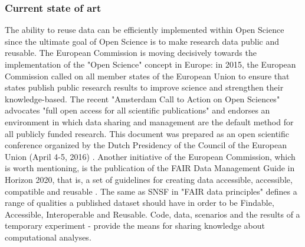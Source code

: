 \documentclass{vldb}
\begin{document}
\subsubsection{Current state of art}
The ability to reuse data can be efficiently implemented within Open Science since the ultimate goal of Open Science is to make research data public and reusable. The European Commission is moving decisively towards the implementation of the "Open Science" concept in Europe: in 2015, the European Commission called on all member states of the European Union to ensure that states publish public research results to improve science and strengthen their knowledge-based\cite{reus1}. The recent "Amsterdam Call to Action on Open Sciences" advocates "full open access for all scientific publications" and endorses an environment in which data sharing and management are the default method for all publicly funded research. This document was prepared as an open scientific conference organized by the Dutch Presidency of the Council of the European Union (April 4-5, 2016) \cite{reus2}. Another initiative of the European Commission, which is worth mentioning, is the publication of the FAIR Data Management Guide in Horizon 2020, that is, a set of guidelines for creating data accessible, accessible, compatible and reusable \cite{reus3}. The same as SNSF in "FAIR data principles"\cite{snsf} defines a range of qualities a published dataset should have in order to be Findable, Accessible, Interoperable and Reusable.
Code, data, scenarios and the results of a temporary experiment - provide the means for sharing knowledge about computational analyses.
\end{document}
